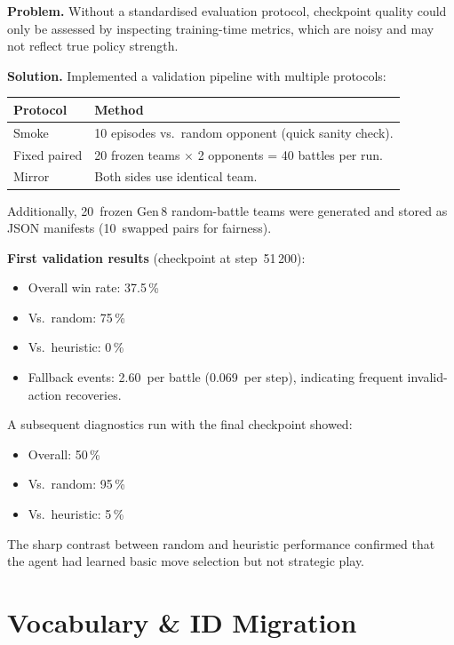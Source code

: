 \textbf{Problem.} Without a standardised evaluation protocol, checkpoint
quality could only be assessed by inspecting training-time metrics, which are
noisy and may not reflect true policy strength.

\textbf{Solution.} Implemented a validation pipeline with multiple protocols:

\begin{center}
\small
\begin{tabularx}{\textwidth}{l X}
  \toprule
  \textbf{Protocol} & \textbf{Method} \\
  \midrule
  Smoke        & 10 episodes vs.\ random opponent (quick sanity check). \\
  Fixed paired & 20 frozen teams $\times$ 2 opponents = 40 battles per run. \\
  Mirror       & Both sides use identical team. \\
  \bottomrule
\end{tabularx}
\end{center}

Additionally, 20~frozen Gen\,8 random-battle teams were generated and stored
as JSON manifests (10~swapped pairs for fairness).

\textbf{First validation results} (checkpoint at step~51\,200):
\begin{itemize}
  \item Overall win rate: 37.5\,\%
  \item Vs.\ random: 75\,\%
  \item Vs.\ heuristic: 0\,\%
  \item Fallback events: 2.60~per battle (0.069~per step), indicating frequent
        invalid-action recoveries.
\end{itemize}

A subsequent diagnostics run with the final checkpoint showed:
\begin{itemize}
  \item Overall: 50\,\%
  \item Vs.\ random: 95\,\%
  \item Vs.\ heuristic: 5\,\%
\end{itemize}

The sharp contrast between random and heuristic performance confirmed that the
agent had learned basic move selection but not strategic play.

\section{Vocabulary \& ID Migration}

